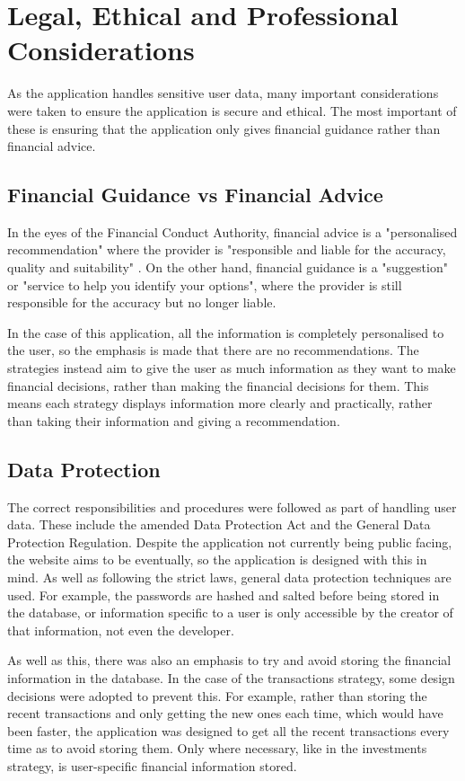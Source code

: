 \section{Legal, Ethical and Professional Considerations}
As the application handles sensitive user data, many important considerations were taken to ensure the application is secure and ethical. The most important of these is ensuring that the application only gives financial guidance rather than financial advice.

\subsection{Financial Guidance vs Financial Advice}
In the eyes of the Financial Conduct Authority, financial advice is a "personalised recommendation" where the provider is "responsible and liable for the accuracy, quality and suitability" \cite{FCA}. On the other hand, financial guidance is a "suggestion" or "service to help you identify your options", where the provider is still responsible for the accuracy but no longer liable.

In the case of this application, all the information is completely personalised to the user, so the emphasis is made that there are no recommendations. The strategies instead aim to give the user as much information as they want to make financial decisions, rather than making the financial decisions for them. This means each strategy displays information more clearly and practically, rather than taking their information and giving a recommendation.

\subsection{Data Protection}
The correct responsibilities and procedures were followed as part of handling user data. These include the amended Data Protection Act and the General Data Protection Regulation. Despite the application not currently being public facing, the website aims to be eventually, so the application is designed with this in mind. As well as following the strict laws, general data protection techniques are used. For example, the passwords are hashed and salted before being stored in the database, or information specific to a user is only accessible by the creator of that information, not even the developer.

As well as this, there was also an emphasis to try and avoid storing the financial information in the database. In the case of the transactions strategy, some design decisions were adopted to prevent this. For example, rather than storing the recent transactions and only getting the new ones each time, which would have been faster, the application was designed to get all the recent transactions every time as to avoid storing them. Only where necessary, like in the investments strategy, is user-specific financial information stored.